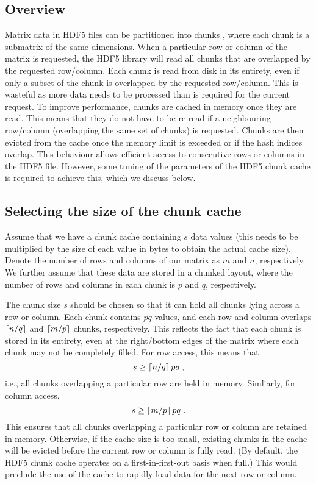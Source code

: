 \documentclass{article}
\begin{document}
\subsection{Overview}
Matrix data in HDF5 files can be partitioned into chunks \cite{hdf5chunk}, where each chunk is a submatrix of the same dimensions.
When a particular row or column of the matrix is requested, the HDF5 library will read all chunks that are overlapped by the requested row/column.
Each chunk is read from disk in its entirety, even if only a subset of the chunk is overlapped by the requested row/column.
This is wasteful as more data needs to be processed than is required for the current request.
To improve performance, chunks are cached in memory once they are read.
This means that they do not have to be re-read if a neighbouring row/column (overlapping the same set of chunks) is requested.
Chunks are then evicted from the cache once the memory limit is exceeded or if the hash indices overlap.
This behaviour allows efficient access to consecutive rows or columns in the HDF5 file.
However, some tuning of the parameters of the HDF5 chunk cache is required to achieve this, which we discuss below.

\subsection{Selecting the size of the chunk cache}
Assume that we have a chunk cache containing $s$ data values (this needs to be multiplied by the size of each value in bytes to obtain the actual cache size).
Denote the number of rows and columns of our matrix as $m$ and $n$, respectively. 
We further assume that these data are stored in a chunked layout, where the number of rows and columns in each chunk is $p$ and $q$, respectively.

The chunk size $s$ should be chosen so that it can hold all chunks lying across a row or column.
Each chunk contains $pq$ values, and each row and column overlaps $\left \lceil n/q \right \rceil$ and $\left \lceil m/p \right \rceil$ chunks, respectively.
This reflects the fact that each chunk is stored in its entirety, even at the right/bottom edges of the matrix where each chunk may not be completely filled.
For row access, this means that 
\begin{equation}
s \ge \left \lceil n/q \right \rceil pq \;, 
\end{equation}
i.e., all chunks overlapping a particular row are held in memory. Simliarly, for column access, 
\begin{equation}
s \ge \left \lceil m/p \right \rceil pq \;.
\end{equation}
This ensures that all chunks overlapping a particular row or column are retained in memory.
Otherwise, if the cache size is too small, existing chunks in the cache will be evicted before the current row or column is fully read.
(By default, the HDF5 chunk cache operates on a first-in-first-out basis when full.)
This would preclude the use of the cache to rapidly load data for the next row or column.
\end{document}
